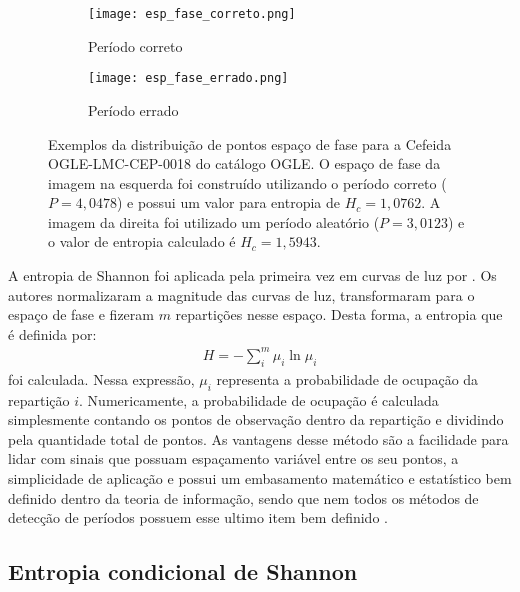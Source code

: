\begin{figure}[!h]
\centering
\begin{subfigure}{.5\textwidth}
  \centering
  \texttt{[image: esp\_fase\_correto.png]}
  \caption{Período correto}
  \label{fig:esp_fase_correto}
\end{subfigure}%
\begin{subfigure}{.5\textwidth}
  \centering
  \texttt{[image: esp\_fase\_errado.png]}
  \caption{Período errado}
  \label{fig:esp_fase_errado}
\end{subfigure}
\caption[Exemplos de entropia]{Exemplos da distribuição de pontos espaço de fase para a Cefeida OGLE-LMC-CEP-0018 do catálogo OGLE. O espaço de fase da imagem na esquerda foi construído utilizando o período correto ($P=4,0478$) e possui um valor para entropia de $H_c = 1,0762$. A imagem da direita foi utilizado um período aleatório ($P=3,0123$) e o valor de entropia calculado é $H_c = 1,5943$.}
\label{fig:exemplo_entropia}
\end{figure}


A entropia de Shannon foi aplicada pela primeira vez em curvas de luz por \citet{entropy}. Os autores normalizaram a magnitude das curvas de luz, transformaram para o espaço de fase e fizeram $m$ repartições nesse espaço. Desta forma, a entropia que é definida por:
\begin{align}
H = - \sum_i^m \mu_i \ln \mu_i
\end{align}
foi calculada. Nessa expressão, $\mu_i$ representa a probabilidade de ocupação da repartição $i$. Numericamente, a probabilidade de ocupação é calculada simplesmente contando os pontos de observação dentro da repartição e dividindo pela quantidade total de pontos. As vantagens desse método são a facilidade para lidar com sinais que possuam espaçamento variável entre os seu pontos, a simplicidade de aplicação e possui um embasamento matemático e estatístico bem definido dentro da teoria de informação, sendo que nem todos os métodos de detecção de períodos possuem esse ultimo item bem definido \citep{entropy}.


\subsection{Entropia condicional de Shannon }

